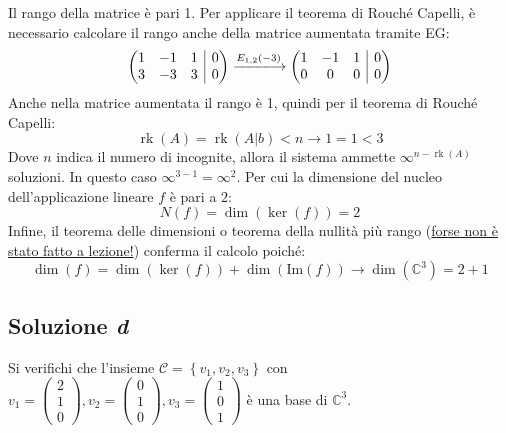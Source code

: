 \documentclass[a4paper]{article}
\makeatletter
\DeclareMathOperator{\rk}{rk}
\newenvironment{rowequmat}[1]{\left(\array{@{}#1@{}}}{\endarray\right)}
\makeatother
\begin{document}
	Il rango della matrice è pari 1. Per applicare il teorema di Rouché Capelli, è necessario calcolare il rango anche della matrice aumentata tramite EG:
	\begin{equation*}
		\begin{rowequmat}{ccc|c}
			1 & -1 & 1 & 0 \\
			3 & -3 & 3 & 0
		\end{rowequmat} \xlongrightarrow{E_{1,2}\left(-3\right)}
		\begin{rowequmat}{ccc|c}
			1 & -1 & 1 & 0 \\
			0 &  0 & 0 & 0
		\end{rowequmat}
	\end{equation*}
	Anche nella matrice aumentata il rango è 1, quindi per il teorema di Rouché Capelli:
	\begin{equation*}
		\rk\left(A\right) = \rk\left(A|b\right) < n \longrightarrow 1 = 1 < 3
	\end{equation*}
	Dove $n$ indica il numero di incognite, allora il sistema ammette $\infty^{n-\rk\left(A\right)}$ soluzioni. In questo caso $\infty^{3-1} = \infty^{2}$. Per cui la dimensione del nucleo dell'applicazione lineare $f$ è pari a $2$:
	\begin{equation*}
		N\left(f\right) = \dim\left(\ker\left(f\right)\right) = 2
	\end{equation*}
	Infine, il teorema delle dimensioni o teorema della nullità più rango (\underline{forse non è} \underline{stato fatto a lezione!}) conferma il calcolo poiché:
	\begin{equation*}
		\dim\left(f\right) = \dim\left(\ker\left(f\right)\right) + \dim\left(\mathrm{Im}\left(f\right)\right) \longrightarrow \dim\left(\mathbb{C}^{3}\right) = 2 + 1
	\end{equation*}
	
	
	\subsection{Soluzione \emph{d}}
	
	Si verifichi che l'insieme $\mathscr{C} = \left\{v_{1}, v_{2}, v_{3}\right\}$ con $v_{1} = \begin{pmatrix}
		2 \\ 1 \\ 0
	\end{pmatrix}, v_{2} = \begin{pmatrix}
		0 \\ 1 \\ 0
	\end{pmatrix}, v_{3} = \begin{pmatrix}
		1 \\ 0 \\ 1
	\end{pmatrix}$ è una base di $\mathbb{C}^{3}$.\newline
	
\end{document}
